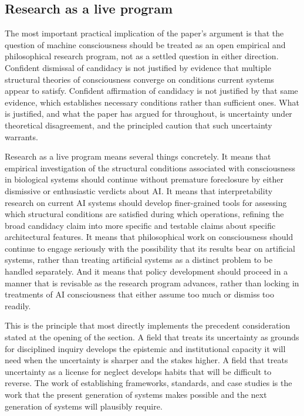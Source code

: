 \documentclass[11pt]{article}
\theoremstyle{foundation}
\begin{document}
\subsection{Research as a live program}

The most important practical implication of the paper's argument is that the question of machine consciousness should be treated as an open empirical and philosophical research program, not as a settled question in either direction. Confident dismissal of candidacy is not justified by evidence that multiple structural theories of consciousness converge on conditions current systems appear to satisfy. Confident affirmation of candidacy is not justified by that same evidence, which establishes necessary conditions rather than sufficient ones. What is justified, and what the paper has argued for throughout, is uncertainty under theoretical disagreement, and the principled caution that such uncertainty warrants.

Research as a live program means several things concretely. It means that empirical investigation of the structural conditions associated with consciousness in biological systems should continue without premature foreclosure by either dismissive or enthusiastic verdicts about AI. It means that interpretability research on current AI systems should develop finer-grained tools for assessing which structural conditions are satisfied during which operations, refining the broad candidacy claim into more specific and testable claims about specific architectural features. It means that philosophical work on consciousness should continue to engage seriously with the possibility that its results bear on artificial systems, rather than treating artificial systems as a distinct problem to be handled separately. And it means that policy development should proceed in a manner that is revisable as the research program advances, rather than locking in treatments of AI consciousness that either assume too much or dismiss too readily.

This is the principle that most directly implements the precedent consideration stated at the opening of the section. A field that treats its uncertainty as grounds for disciplined inquiry develops the epistemic and institutional capacity it will need when the uncertainty is sharper and the stakes higher. A field that treats uncertainty as a license for neglect develops habits that will be difficult to reverse. The work of establishing frameworks, standards, and case studies is the work that the present generation of systems makes possible and the next generation of systems will plausibly require.
\end{document}
